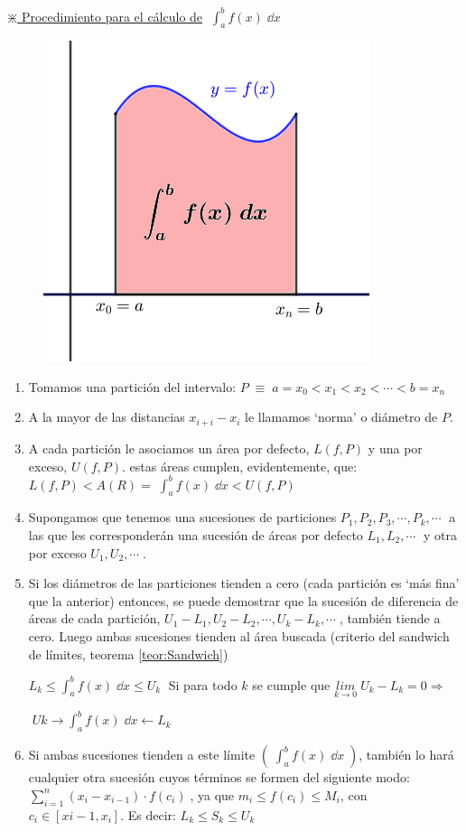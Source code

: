 \begin{multicols}{2}

\underline {$\divideontimes$ Procedimiento para el cálculo de}  $\displaystyle \; \int_a^b f(x)\; \dd x \; $

\begin{figure}[H]
	\centering
	\includegraphics[width=.4\textwidth]{imagenes/imagenes08/T08IM03.png}
\end{figure}

\begin{enumerate}[1.- ]
	\item Tomamos una partición del intervalo: $P\; \equiv \; a=x_0<x_1<x_2< \cdots <b=x_n$
	\item A la mayor de las distancias $x_{i+i}-x_i$ le llamamos `norma' o diámetro de $P$.
	\item A cada partición le asociamos un área por defecto, $L(f,P)$ y una por exceso, $U(f,P)$. estas áreas cumplen, evidentemente, que:
	$L(f,P) < A(R)= \displaystyle \; \int_a^b f(x)\; \dd x < U(f,P)$
	\item Supongamos que tenemos una sucesiones de particiones $P_1, P_2, P_3, \cdots , P_k, \cdots \; $ a las que les corresponderán una sucesión de áreas por defecto $L_1, L_2, \cdots \; $ y otra por exceso $U_1, U_2, \cdots \; $.
	\item Si los diámetros de las particiones tienden a cero (cada partición es `más fina' que la anterior) entonces, se puede demostrar que la sucesión de diferencia de áreas de cada partición, $U_1-L_1, U_2-L_2, \cdots , U_k-L_k, \cdots \; $, también tiende a cero. Luego ambas sucesiones tienden al área buscada (criterio del sandwich de límites, teorema \ref{teor:Sandwich})
	
	$\displaystyle  L_k\le \int_a^b f(x)\; \dd x \le U_k \; $ Si para todo $k$ se cumple que $\underset {k\to 0}{lim}\; {U_k-L_k}=0 \Rightarrow \quad$
	
	\centerline{$\boxed{\; \displaystyle Uk \rightarrow \int_a^b f(x)\; \dd x \leftarrow L_k \;} $}
	
	\item Si ambas sucesiones tienden a este límite $\left( \; \displaystyle \int_a^b f(x)\; \dd x \; \right)$, también lo hará cualquier otra sucesión cuyos términos se formen del siguiente modo:
	$\displaystyle \sum _{ i=1 }^{ n }{ ({ x }_{ i }-{ x }_{ i-1 })\cdot f({ c }_{ i }) } \; $, ya que $m_i\le f(c_i)\le M_i$, con $c_i\in [x{i-1},x_i]$. Es decir: $L_k\le S_k\le U_k$
	
\end{enumerate}
\end{multicols}

